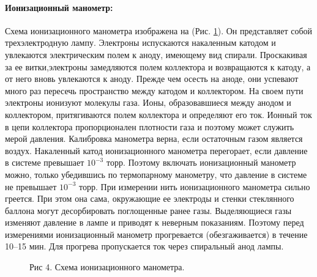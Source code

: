 \documentclass[a4paper]{article}
\begin{document}
    \paragraph{Ионизационный манометр:}
    Схема ионизационного манометра изображена на (Рис. \ref{ris:ionizacionni_monometr}). Он представляет собой трехэлектродную лампу. Электроны испускаются накаленным катодом и увлекаются электрическим полем к аноду, имеющему вид спирали. Проскакивая за ее витки,электроны замедляются полем коллектора и возвращаются к катоду, а от него вновь увлекаются к аноду. Прежде чем осесть на аноде, они успевают много раз пересечь пространство между катодом и коллектором. На своем пути электроны ионизуют молекулы газа. Ионы, образовавшиеся между анодом и коллектором, притягиваются полем коллектора и определяют его ток. Ионный ток в цепи коллектора пропорционален плотности газа и поэтому может служить мерой давления. Калибровка манометра верна, если остаточным газом является воздух. Накаленный катод ионизационного манометра перегорает, если давление в системе превышает $10^{-3}$ торр. Поэтому включать ионизационный манометр можно, только убедившись по термопарному манометру, что давление в системе не превышает $10^{-3}$ торр. При измерении нить ионизационного манометра сильно греется. При этом она сама, окружающие ее электроды и стенки стеклянного баллона могут десорбировать поглощенные ранее газы. Выделяющиеся газы изменяют давление в лампе и приводят к неверным показаниям. Поэтому перед измерениями ионизационный манометр прогревается (обезгаживается) в течение 10–15 мин. Для прогрева пропускается ток через спиральный анод лампы.

    \vspace{1cm}

    \begin{figure}[h]
        \caption{Рис 4. Схема ионизационного манометра.}
        \label{ris:ionizacionni_monometr}
    \end{figure}
\end{document}
